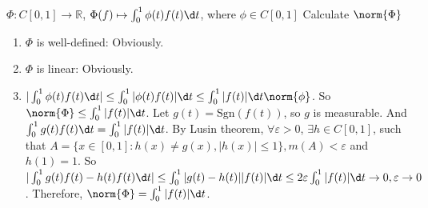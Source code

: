 \documentclass{ctexart}
\begin{document}
\begin{problem}
    $\Phi: C[0,1]\to \mathbb{R}$, $\Phi(f)\mapsto \int_0^1\phi(t)f(t)\d t$, where $\phi\in C[0,1]$ Calculate $\norm{\Phi}$
\end{problem}
\begin{solution}
  \begin{enumerate}
    \item \(\Phi\) is well-defined: Obviously.
    \item \(\Phi\) is linear: Obviously.
    \item \(|\int_{0}^1 \phi(t)f(t) \d t| \leq \int_0^1 |\phi(t)f(t)| \d t \leq \int_{0}^1 |f(t)| \d t \norm{\phi}  \).
      So \(\norm{\Phi} \leq \int_{0}^1 |f(t)| \d t\).
      Let \(g(t) = \mathrm{Sgn}(f(t))\), so \(g\) is measurable. 
      And \(\int_{0}^1 g(t)f(t) \d t = \int_{0}^1 |f(t)| \d t\). By Lusin theorem, 
      \(\forall \varepsilon>0\), \(\exists h \in C[0,1]\), such that \(A=\{x \in [0,1]: h(x) \neq g(x), |h(x)| \leq 1\}, m(A) < \varepsilon\) and \(h(1) = 1\).
      So \(|\int_{0}^1 g(t)f(t)- h(t)f(t) \d t| \leq \int_{0}^1 |g(t)-h(t)| |f(t)| \d t \leq 2\varepsilon \int_{0}^1 |f(t)| \d t \to 0, \varepsilon \to 0  \).
      Therefore, \(\norm{\Phi} = \int_{0}^1 |f(t)| \d t \).
  \end{enumerate}
\end{solution}
\end{document}
